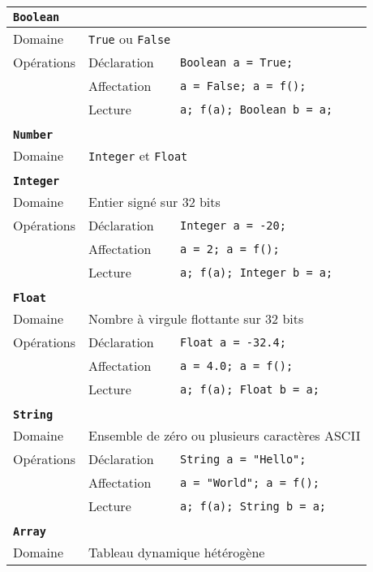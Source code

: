 \documentclass[french]{article}
\begin{document}
				\begin{longtable}{lll}
					\textbf{\texttt{Boolean}}\\ \hline \hline
					Domaine & \multicolumn{2}{l}{\texttt{True} ou \texttt{False}}\\ 
					Opérations & Déclaration & \texttt{Boolean a = True;}\\
							   & Affectation & \texttt{a = False; a = f();}\\
							   & Lecture & \texttt{a; f(a); Boolean b = a;}\\ 
					\\
					\textbf{\texttt{Number}}\\ \hline \hline
					Domaine & \multicolumn{2}{l}{\texttt{Integer} et \texttt{Float}}\\ 
					\\
					\textbf{\texttt{Integer}}\\ \hline \hline
					Domaine & \multicolumn{2}{l}{Entier signé sur 32 bits}\\
					Opérations & Déclaration & \texttt{Integer a = -20;}\\
							   & Affectation & \texttt{a = 2; a = f();}\\
							   & Lecture & \texttt{a; f(a); Integer b = a;}\\ 
					\\
					\textbf{\texttt{Float}}\\ \hline \hline
					Domaine & \multicolumn{2}{l}{Nombre à virgule flottante sur 32 bits}\\
					Opérations & Déclaration & \texttt{Float a = -32.4;}\\
							   & Affectation & \texttt{a = 4.0; a = f();}\\
							   & Lecture & \texttt{a; f(a); Float b = a;}\\ 
					\\
					\textbf{\texttt{String}}\\ \hline \hline
					Domaine & \multicolumn{2}{l}{Ensemble de zéro ou plusieurs caractères ASCII}\\
					Opérations & Déclaration & \texttt{String a = "Hello";}\\
							   & Affectation & \texttt{a = "World"; a = f();}\\
							   & Lecture & \texttt{a; f(a); String b = a;}\\ 
					\\
					\textbf{\texttt{Array}}\\ \hline \hline
					Domaine & \multicolumn{2}{l}{Tableau dynamique hétérogène}\\

\end{longtable}
\end{document}
